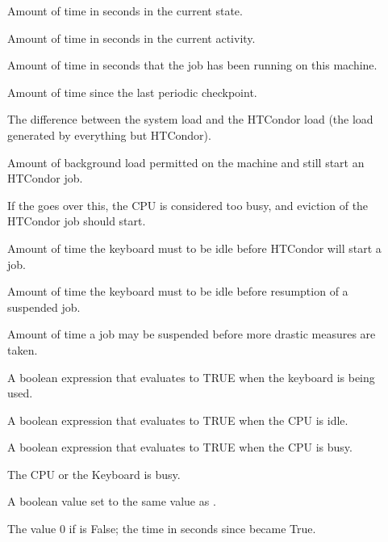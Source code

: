 \begin{description}
  
\item[] Amount of time in seconds in the current state.

\item[] Amount of time in seconds in the current activity. 

\item[] Amount of time in seconds that the job has been
  running on this machine.

\item[] Amount of time since the last periodic checkpoint.

\item[] The difference between the system load and
  the HTCondor load (the load generated by everything but HTCondor).

\item[] Amount of background load permitted
  on the machine and still start an HTCondor job.

\item[] If the  goes over
  this, the CPU is considered too busy, and eviction of the HTCondor
  job should start. 

\item[] Amount of time the keyboard must to be idle
  before HTCondor will start a job.

\item[] Amount of time the keyboard must to be idle
  before resumption of a suspended job.

\item[] Amount of time a job may be
  suspended before more drastic measures are taken.

\item[] A boolean expression that evaluates to TRUE
    when the keyboard is being used.

\item[] A boolean expression that evaluates to TRUE
    when the CPU is idle.

\item[] A boolean expression that evaluates
    to TRUE when the CPU is busy.

\item[] The CPU or the Keyboard is busy.

\item[] A boolean value set to the same value as 
    .

\item[] The value 0 if 
    is False; the time in seconds since
     became True.
    
\end{description}


